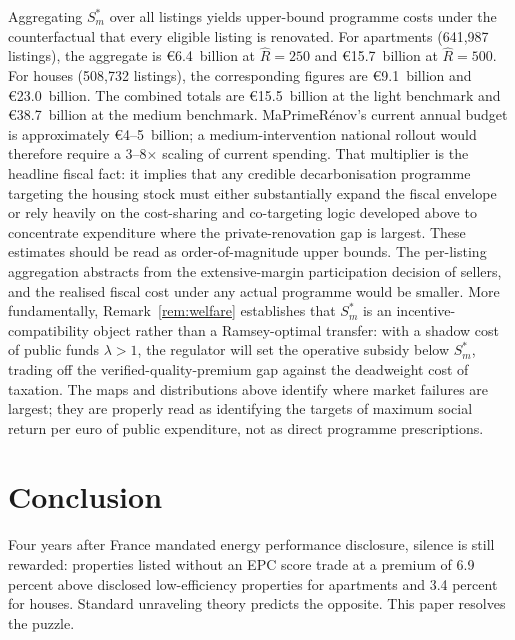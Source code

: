 \documentclass[10pt,letterpaper]{bp-template-concise}
\begin{document}
Aggregating $S^*_m$ over all listings yields upper-bound programme costs under the counterfactual that every eligible listing is renovated. For apartments (641{,}987 listings), the aggregate is \euro{}6.4~billion at $\hat{R} = 250$ and \euro{}15.7~billion at $\hat{R} = 500$. For houses (508{,}732 listings), the corresponding figures are \euro{}9.1~billion and \euro{}23.0~billion. The combined totals are \euro{}15.5~billion at the light benchmark and \euro{}38.7~billion at the medium benchmark. MaPrimeRénov's current annual budget is approximately \euro{}4--5~billion; a medium-intervention national rollout would therefore require a 3--8$\times$ scaling of current spending. That multiplier is the headline fiscal fact: it implies that any credible decarbonisation programme targeting the housing stock must either substantially expand the fiscal envelope or rely heavily on the cost-sharing and co-targeting logic developed above to concentrate expenditure where the private-renovation gap is largest. These estimates should be read as order-of-magnitude upper bounds. The per-listing aggregation abstracts from the extensive-margin participation decision of sellers, and the realised fiscal cost under any actual programme would be smaller. More fundamentally, Remark~\ref{rem:welfare} establishes that $S^*_m$ is an incentive-compatibility object rather than a Ramsey-optimal transfer: with a shadow cost of public funds $\lambda > 1$, the regulator will set the operative subsidy below $S^*_m$, trading off the verified-quality-premium gap against the deadweight cost of taxation. The maps and distributions above identify where market failures are largest; they are properly read as identifying the targets of maximum social return per euro of public expenditure, not as direct programme prescriptions.

\section{Conclusion}

Four years after France mandated energy performance disclosure, silence is still rewarded: properties listed without an EPC score trade at a premium of 6.9 percent above disclosed low-efficiency properties for apartments and 3.4 percent for houses. Standard unraveling theory predicts the opposite. This paper resolves the puzzle.
\end{document}
